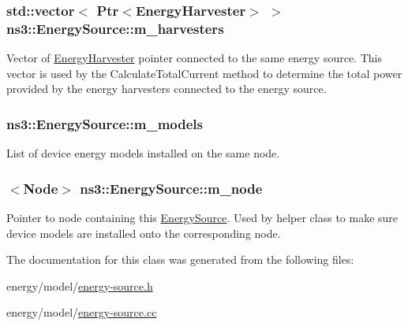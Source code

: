 \subsubsection[{\texorpdfstring{m\+\_\+harvesters}{m_harvesters}}]{\setlength{\rightskip}{0pt plus 5cm}std\+::vector$<$ {\bf Ptr}$<${\bf Energy\+Harvester}$>$ $>$ ns3\+::\+Energy\+Source\+::m\+\_\+harvesters\hspace{0.3cm}{\ttfamily [private]}}\hypertarget{classns3_1_1EnergySource_a691b18205f260bcd09fc09fedb4eca8d}{}\label{classns3_1_1EnergySource_a691b18205f260bcd09fc09fedb4eca8d}
Vector of \hyperlink{classns3_1_1EnergyHarvester}{Energy\+Harvester} pointer connected to the same energy source. This vector is used by the Calculate\+Total\+Current method to determine the total power provided by the energy harvesters connected to the energy source. 
\subsubsection[{\texorpdfstring{m\+\_\+models}{m_models}}]{ ns3\+::\+Energy\+Source\+::m\+\_\+models\hspace{0.3cm}{\ttfamily [private]}}\hypertarget{classns3_1_1EnergySource_a82cef6362500415c287d0193ea136c5b}{}\label{classns3_1_1EnergySource_a82cef6362500415c287d0193ea136c5b}
List of device energy models installed on the same node. 
\subsubsection[{\texorpdfstring{m\+\_\+node}{m_node}}]{$<${\bf Node}$>$ ns3\+::\+Energy\+Source\+::m\+\_\+node\hspace{0.3cm}{\ttfamily [private]}}\hypertarget{classns3_1_1EnergySource_a9713a3d997239bf17b3779694365e1a7}{}\label{classns3_1_1EnergySource_a9713a3d997239bf17b3779694365e1a7}
Pointer to node containing this \hyperlink{classns3_1_1EnergySource}{Energy\+Source}. Used by helper class to make sure device models are installed onto the corresponding node. 

The documentation for this class was generated from the following files\+:\begin{DoxyCompactItemize}
\item 
energy/model/\hyperlink{energy-source_8h}{energy-\/source.\+h}\item 
energy/model/\hyperlink{energy-source_8cc}{energy-\/source.\+cc}\end{DoxyCompactItemize}

